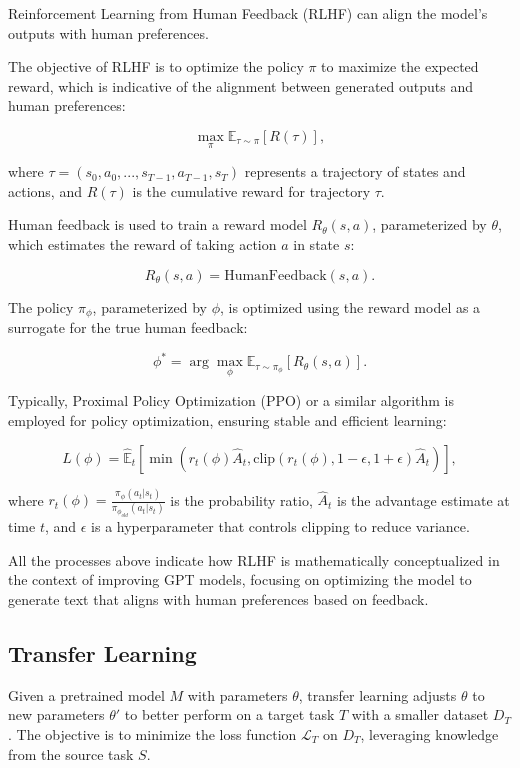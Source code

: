 \documentclass[11pt,a4paper,oneside]{report}
\begin{document}
Reinforcement Learning from Human Feedback (RLHF) \cite{christiano2017deep} can align the model's outputs with human preferences. 

The objective of RLHF is to optimize the policy $\pi$ to maximize the expected reward, which is indicative of the alignment between generated outputs and human preferences:

\begin{equation}
\max_{\pi} \mathbb{E}_{\tau \sim \pi} [R(\tau)],
\end{equation}

where $\tau = (s_0, a_0, ..., s_{T-1}, a_{T-1}, s_T)$ represents a trajectory of states and actions, and $R(\tau)$ is the cumulative reward for trajectory $\tau$.

Human feedback is used to train a reward model $R_{\theta}(s,a)$, parameterized by $\theta$, which estimates the reward of taking action $a$ in state $s$:

\begin{equation}
R_{\theta}(s,a) = \text{HumanFeedback}(s, a).
\end{equation}

The policy $\pi_{\phi}$, parameterized by $\phi$, is optimized using the reward model as a surrogate for the true human feedback:

\begin{equation}
\phi^{*} = \arg\max_{\phi} \mathbb{E}_{\tau \sim \pi_{\phi}} [R_{\theta}(s,a)].
\end{equation}

Typically, Proximal Policy Optimization (PPO) or a similar algorithm is employed for policy optimization, ensuring stable and efficient learning:

\begin{equation}
L(\phi) = \hat{\mathbb{E}}_t \left[ \min(r_t(\phi) \hat{A}_t, \text{clip}(r_t(\phi), 1-\epsilon, 1+\epsilon) \hat{A}_t) \right],
\end{equation}

where $r_t(\phi) = \frac{\pi_{\phi}(a_t|s_t)}{\pi_{\phi_{old}}(a_t|s_t)}$ is the probability ratio, $\hat{A}_t$ is the advantage estimate at time $t$, and $\epsilon$ is a hyperparameter that controls clipping to reduce variance.

All the processes above indicate how RLHF is mathematically conceptualized in the context of improving GPT models, focusing on optimizing the model to generate text that aligns with human preferences based on feedback.

\subsection{Transfer Learning}
Given a pretrained model \(M\) with parameters \(\theta\), transfer learning \cite{torrey2010transfer} adjusts \(\theta\) to new parameters \(\theta'\) to better perform on a target task \(T\) with a smaller dataset \(D_{T}\). The objective is to minimize the loss function \(\mathcal{L}_{T}\) on \(D_{T}\), leveraging knowledge from the source task \(S\).
\end{document}

